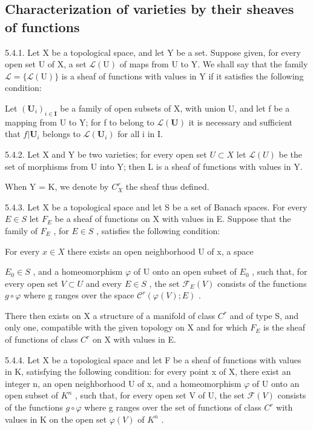 \subsection{Characterization of varieties by their sheaves of functions}

5.4.1. Let X be a topological space, and let Y be a set. Suppose given, for every open set U of X, a set \(\mathcal{L}(\mathrm{U})\) of maps from U to Y. We shall say that the family \(\mathcal{L} = \{\mathcal{L}(\mathrm{U})\}\) is a sheaf of functions with values in Y if it satisfies the following condition:

Let \((\mathbf{U}_{i})_{i\in\mathbf{I}}\) be a family of open subsets of X, with union U, and let f be a mapping from U to Y; for f to belong to \(\mathcal{L}(\mathbf{U})\) it is necessary and sufficient that \(f|\mathbf{U}_{i}\) belongs to \(\mathcal{L}(\mathbf{U}_{i})\) for all i in I.

5.4.2. Let X and Y be two varieties; for every open set \(U \subset X\) let \(\mathcal{L}(U)\) be the set of morphisms from U into Y; then L is a sheaf of functions with values in Y.

When Y = K, we denote by \(C_{X}^{r}\) the sheaf thus defined.

5.4.3. Let X be a topological space and let S be a set of Banach spaces. For every \(E \in S\) let \(F_{E}\) be a sheaf of functions on X with values in E. Suppose that the family of \(F_{E}\) , for \(E \in S\) , satisfies the following condition:

For every \(x \in X\) there exists an open neighborhood U of x, a space

\(E_{0} \in S\) , and a homeomorphism \(\varphi\) of U onto an open subset of \(E_{0}\) , such that, for every open set \(V \subset U\) and every \(E \in S\) , the set \(\mathcal{F}_{E}(V)\) consists of the functions \(g \circ \varphi\) where g ranges over the space \(\mathcal{C}^{r}(\varphi(V); E)\) .

There then exists on X a structure of a manifold of class \(C^{r}\) and of type S, and only one, compatible with the given topology on X and for which \(F_{E}\) is the sheaf of functions of class \(C^{r}\) on X with values in E.

5.4.4. Let X be a topological space and let F be a sheaf of functions with values in K, satisfying the following condition: for every point x of X, there exist an integer n, an open neighborhood U of x, and a homeomorphism \(\varphi\) of U onto an open subset of \(K^{n}\) , such that, for every open set V of U, the set \(\mathcal{F}(V)\) consists of the functions \(g \circ \varphi\) where g ranges over the set of functions of class \(C^{r}\) with values in K on the open set \(\varphi(V)\) of \(K^{n}\) .

